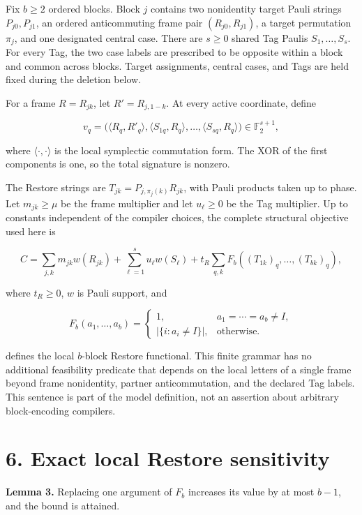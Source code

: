 \documentclass[
  11pt,
]{article}
\begin{document}
Fix \(b\ge2\) ordered blocks. Block \(j\) contains two nonidentity
target Pauli strings \(P_{j0},P_{j1}\), an ordered anticommuting frame
pair \((R_{j0},R_{j1})\), a target permutation \(\pi_j\), and one
designated central case. There are \(s\ge0\) shared Tag Paulis
\(S_1,\ldots,S_s\). For every Tag, the two case labels are prescribed to
be opposite within a block and common across blocks. Target assignments,
central cases, and Tags are held fixed during the deletion below.

For a frame \(R=R_{jk}\), let \(R'=R_{j,1-k}\). At every active
coordinate, define

\[
v_q=\bigl(\langle R_q, R'_q\rangle,
\langle S_{1q}, R_q\rangle, \ldots,
\langle S_{sq}, R_q\rangle\bigr)
\in\mathbb F_2^{s+1},
\]

where \(\langle\cdot, \cdot\rangle\) is the local symplectic commutation
form. The XOR of the first components is one, so the total signature is
nonzero.

The Restore strings are \(T_{jk}=P_{j,\pi_j(k)}R_{jk}\), with Pauli
products taken up to phase. Let \(m_{jk}\ge\mu\) be the frame multiplier
and let \(u_\ell\ge0\) be the Tag multiplier. Up to constants
independent of the compiler choices, the complete structural objective
used here is

\[
C=\sum_{j,k}m_{jk}w(R_{jk})
 +\sum_{\ell=1}^s u_\ell w(S_\ell)
 +t_R\sum_{q,k}F_b((T_{1k})_q,\ldots,(T_{bk})_q),
\]

where \(t_R\ge0\), \(w\) is Pauli support, and

\[
F_b(a_1, \ldots, a_b)=
\begin{cases}
1, & a_1=\cdots=a_b\ne I, \\
|\{i:a_i\ne I\}|, & \text{otherwise}.
\end{cases}
\]

defines the local \(b\)-block Restore functional. This finite grammar
has no additional feasibility predicate that depends on the local
letters of a single frame beyond frame nonidentity, partner
anticommutation, and the declared Tag labels. This sentence is part of
the model definition, not an assertion about arbitrary block-encoding
compilers.

\hypertarget{exact-local-restore-sensitivity}{%
\section{6. Exact local Restore
sensitivity}\label{exact-local-restore-sensitivity}}

\textbf{Lemma 3.} Replacing one argument of \(F_b\) increases its value
by at most \(b-1\), and the bound is attained.
\end{document}
